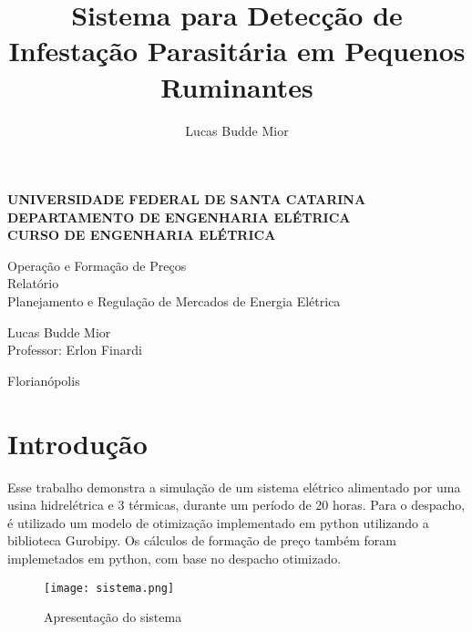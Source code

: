 \documentclass[a4paper,12pt,twoside]{article}
\title{Sistema para Detecção de Infestação Parasitária em Pequenos Ruminantes}
\author{Lucas Budde Mior}
\newenvironment{boldenv}
{\bfseries}
{}
\begin{document}
\begin{titlepage}
   \large
   \begin{center}
       \begin{boldenv}
           UNIVERSIDADE FEDERAL DE SANTA CATARINA \\
           DEPARTAMENTO DE ENGENHARIA ELÉTRICA \\
           CURSO DE ENGENHARIA ELÉTRICA \\
           \vspace*{2cm}

           \vspace*{\fill}
           Operação e Formação de Preços \\
           \vspace*{1cm}
           Relatório \\
           \vspace*{1cm}
           Planejamento e Regulação de Mercados de Energia Elétrica
           \vspace*{\fill}

           Lucas Budde Mior \\
           \vspace{0.5cm}
           Professor: Erlon Finardi

           \vfill

           Florianópolis
       \end{boldenv}
   \end{center}
\end{titlepage}
\renewcommand{\contentsname}{Sumário}

\pagestyle{empty}
\tableofcontents
\newpage

\pagestyle{plain}
\section{Introdução} %
Esse trabalho demonstra a simulação de um sistema elétrico alimentado por uma usina hidrelétrica e 3 térmicas, durante um período de 20 horas.
Para o despacho, é utilizado um modelo de otimização implementado em python utilizando a biblioteca Gurobipy.
Os cálculos de formação de preço também foram implemetados em python, com base no despacho otimizado.

\begin{figure}[h!]
    \centering
  \texttt{[image: sistema.png]}
  \caption{Apresentação do sistema}\label{fig:sistema}
\end{figure}
\end{document}
